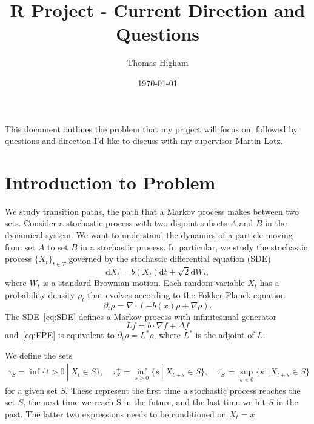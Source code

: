 \documentclass[ 11pt]{article}
\title{R Project - Current Direction and Questions}
\author{Thomas Higham}
\date{\today}
\theoremstyle{definition}
\newcommand{\diff}[1]{\mathrm{d}#1}
\begin{document}
\maketitle

This document outlines the problem that my project will focus on, followed by questions and direction I'd like to discuss with my supervisor Martin Lotz.

\section{Introduction to Problem}

We study transition paths, the path that a Markov process makes between two sets. Consider a stochastic process with two disjoint subsets $A$ and $B$ in the dynamical system. We want to understand the dynamics of a particle moving from set $A$ to set $B$ in a stochastic process. In particular, we study the stochastic process $\{X_t\}_{t\in T}$ governed by the stochastic differential equation (SDE)
\begin{equation}\label{eq:SDE}
 \diff{X_t} = b(X_t)\diff{t}+\sqrt{2}\diff{W_t},
\end{equation}
where $W_t$ is a standard Brownian motion. 
Each random variable $X_t$ has a probability density $\rho_t$ that evolves according to the Fokker-Planck equation
\begin{equation}\label{eq:FPE}
\partial_t \rho = \nabla \cdot (-b(x)\rho+\nabla \rho).
\end{equation}
The SDE~\eqref{eq:SDE} defines a Markov process with infinitesimal generator
\begin{equation}\label{eq:generator}
  Lf = b\cdot \nabla f+\Delta f
\end{equation}
and~\eqref{eq:FPE} is equivalent to $\partial_t \rho = L^*\rho$, where $L^*$ is the adjoint of $L$. 

We define the sets
\begin{align*}
 \tau_S = \inf \{ t>0 \ | \ X_t\in S\}, \quad
 \tau_S^+ = \inf_{s>0} \{ s \ |\ X_{t+s}\in S \}, \quad
 \tau_S^- = \sup_{s<0} \{ s \ |\ X_{t+s}\in S\}
\end{align*}
for a given set $S$. These represent the first time a stochastic process reaches the set $S$,  the next time we reach S in the future, and the last time we hit $S$ in the past. The latter two expressions needs to be conditioned on $X_t = x$.
\end{document}
